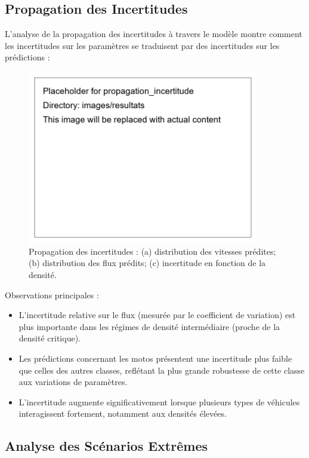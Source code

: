 \subsection{Propagation des Incertitudes}
\label{subsec:propagation}

L'analyse de la propagation des incertitudes à travers le modèle montre comment les incertitudes sur les paramètres se traduisent par des incertitudes sur les prédictions :

\begin{figure}[htbp]
\centering
\includegraphics[width=0.9\textwidth]{images/resultats/propagation_incertitude}
\caption{Propagation des incertitudes : (a) distribution des vitesses prédites; (b) distribution des flux prédits; (c) incertitude en fonction de la densité.}
\label{fig:propagation_incertitude}
\end{figure}

Observations principales :
\begin{itemize}
\item L'incertitude relative sur le flux (mesurée par le coefficient de variation) est plus importante dans les régimes de densité intermédiaire (proche de la densité critique).
\item Les prédictions concernant les motos présentent une incertitude plus faible que celles des autres classes, reflétant la plus grande robustesse de cette classe aux variations de paramètres.
\item L'incertitude augmente significativement lorsque plusieurs types de véhicules interagissent fortement, notamment aux densités élevées.
\end{itemize}

\subsection{Analyse des Scénarios Extrêmes}
\label{subsec:scenarios_extremes}

